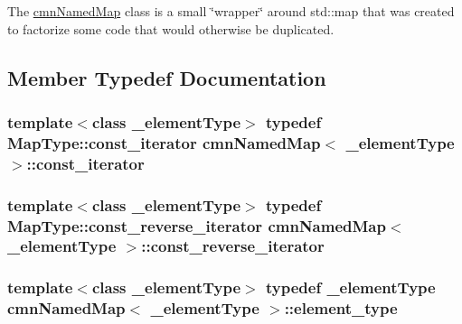 The \hyperlink{classcmn_named_map}{cmn\+Named\+Map} class is a small \char`\"{}wrapper\char`\"{} around std\+::map that was created to factorize some code that would otherwise be duplicated. 

\subsection{Member Typedef Documentation}
\hypertarget{classcmn_named_map_a94a2be09d6678944e3a330c641d69d41}{}
\subsubsection[{const\+\_\+iterator}]{\setlength{\rightskip}{0pt plus 5cm}template$<$class \+\_\+element\+Type$>$ typedef Map\+Type\+::const\+\_\+iterator {\bf cmn\+Named\+Map}$<$ \+\_\+element\+Type $>$\+::{\bf const\+\_\+iterator}}\label{classcmn_named_map_a94a2be09d6678944e3a330c641d69d41}
\hypertarget{classcmn_named_map_ad32ba46e0f30a14d943acac6b229094c}{}
\subsubsection[{const\+\_\+reverse\+\_\+iterator}]{\setlength{\rightskip}{0pt plus 5cm}template$<$class \+\_\+element\+Type$>$ typedef Map\+Type\+::const\+\_\+reverse\+\_\+iterator {\bf cmn\+Named\+Map}$<$ \+\_\+element\+Type $>$\+::{\bf const\+\_\+reverse\+\_\+iterator}}\label{classcmn_named_map_ad32ba46e0f30a14d943acac6b229094c}
\hypertarget{classcmn_named_map_a04797ca34105e40893cf1bdbea391f32}{}
\subsubsection[{element\+\_\+type}]{\setlength{\rightskip}{0pt plus 5cm}template$<$class \+\_\+element\+Type$>$ typedef \+\_\+element\+Type {\bf cmn\+Named\+Map}$<$ \+\_\+element\+Type $>$\+::{\bf element\+\_\+type}}\label{classcmn_named_map_a04797ca34105e40893cf1bdbea391f32}
\hypertarget{classcmn_named_map_a0ad463b349c3c95e8f639e12f492765e}{}
